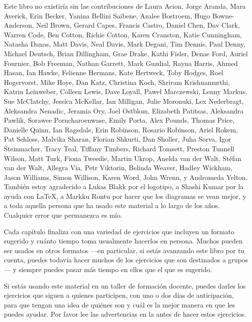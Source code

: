 
Este libro no existiría sin las contribuciones de
Laura Acion,
Jorge Aranda,
Mara Averick,
Erin Becker,
Yanina Bellini Saibene,
Azalee Bostroem,
Hugo Bowne-Anderson,
Neil Brown,
Gerard Capes,
Francis Castro,
Daniel Chen,
Dav Clark,
Warren Code,
Ben Cotton,
Richie Cotton,
Karen Cranston,
Katie Cunningham,
Natasha Danas,
Matt Davis,
Neal Davis,
Mark Degani,
Tim Dennis,
Paul Denny,
Michael Deutsch,
Brian Dillingham,
Grae Drake,
Kathi Fisler,
Denae Ford,
Auriel Fournier,
Bob Freeman,
Nathan Garrett,
Mark Guzdial,
Rayna Harris,
Ahmed Hasan,
Ian Hawke,
Felienne Hermans,
Kate Hertweck,
Toby Hodges,
Roel Hogervorst,
Mike Hoye,
Dan Katz,
Christina Koch,
Shriram Krishnamurthi,
Katrin Leinweber,
Colleen Lewis,
Dave Loyall,
Paweł Marczewski,
Lenny Markus,
Sue McClatchy,
Jessica McKellar,
Ian Milligan,
Julie Moronuki,
Lex Nederbragt,
Aleksandra Nenadic,
Jeramia Ory,
Joel Ostblom,
Elizabeth Patitsas,
Aleksandra Pawlik,
Sorawee Porncharoenwase,
Emily Porta,
Alex Pounds,
Thomas Price,
Danielle Quinn,
Ian Ragsdale,
Erin Robinson,
Rosario Robinson,
Ariel Rokem,
Pat Schloss,
Malvika Sharan,
Florian Shkurti,
Dan Sholler,
Juha Sorva,
Igor Steinmacher,
Tracy Teal,
Tiffany Timbers,
Richard Tomsett,
Preston Tunnell Wilson,
Matt Turk,
Fiona Tweedie,
Martin Ukrop,
Anelda van der Walt,
Stéfan van der Walt,
Allegra Via,
Petr Viktorin,
Belinda Weaver,
Hadley Wickham,
Jason Williams,
Simon Willison,
Karen Word,
John Wrenn,
y Andromeda Yelton.
También estoy agradecido a Lukas Blakk por el logotipo,
a Shashi Kumar por la ayuda con LaTeX,
a Markku Rontu por hacer que los diagramas se vean mejor,
y a toda aquella persona que ha usado este material a lo largo de los años.
Cualquier error que permanezca es mío. 


Cada capítulo finaliza con una variedad de ejercicios que incluyen un formato sugerido y cuánto tiempo toma usualmente hacerlos en persona.
Muchos pueden ser usados en otros formatos ---en particular,
si estás avanzando este libro por tu cuenta,
puedes todavía hacer muchos de los ejercicios que son destinados a grupos--- y siempre
puedes pasar más tiempo en ellos que el que es sugerido.

Si estás usando este material en un taller de formación docente,
puedes darles los ejercicios que siguen a quienes participen, con uno o dos días de anticipación,
para que tengan una idea de quiénes son y cuál es la mejor manera en que les puedes ayudar. 
Por favor lee las advertencias en la  antes de hacer estos ejercicios.

